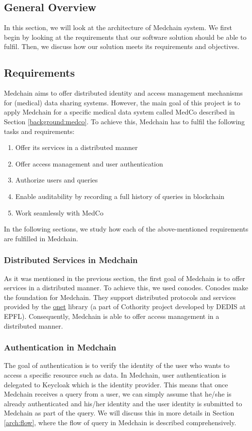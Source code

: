 \subsection{General Overview} \label{arch:general Overview}
In this section, we will look at the architecture of Medchain system. We first begin by looking at the requirements that our software solution should be able to fulfil. Then, we discuss how our solution meets its requirements and objectives. 

\subsection{Requirements} \label{arch:requirements}
Medchain aims to offer distributed identity and access management mechanisms for (medical) data sharing systems. However, the main goal of this project is to apply Medchain for a specific medical data system called MedCo described in Section \ref{background:medco}. To achieve this, Medchain has to fulfil the following tasks and requirements:
\begin{enumerate}
    \item Offer its services in a distributed manner 
    \item Offer access management and user authentication 
    \item Authorize users and queries
    \item Enable auditability by recording a full history of queries in blockchain
    \item Work seamlessly with MedCo
\end{enumerate}
In the following sections, we study how each of the above-mentioned requirements are fulfilled in Medchain. 

\subsubsection{Distributed Services in Medchain} \label{arch:distributed}
As it was mentioned in the previous section, the first goal of Medchain is to offer services in a distributed manner. To achieve this, we used conodes. Conodes make the foundation for Medchain. They support distributed protocols and services provided by the \href{https://github.com/dedis/onet/blob/master/README.md}{onet} library (a part of Cothority project developed by DEDIS at EPFL). Consequently, Medchain is able to offer access management in a distributed manner. 

\subsubsection{Authentication in Medchain}\label{arch:authentication}
The goal of authentication is to verify the identity of the user who wants to access a specific resource such as data. In Medchain, user authentication is delegated to Keycloak \cite{keycloak:2019} which is the identity provider. This means that once Medchain receives a query from a user, we can simply assume that he/she is already authenticated and his/her identity and the user identity is submitted to Medchain as part of the query. We will discuss this in more details in Section \ref{arch:flow}, where the flow of query in Medchain is described comprehensively.

